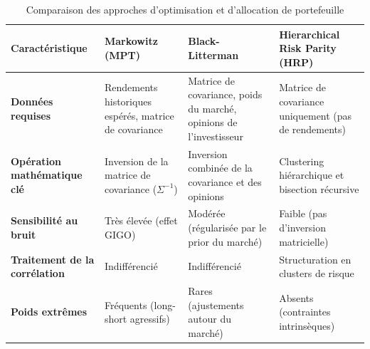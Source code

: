 \begin{table}[h]
\centering
\small
\begin{tabular}{p{3.5cm}p{3.5cm}p{3.8cm}p{3.8cm}}
\toprule
\textbf{Caractéristique} & \textbf{Markowitz (MPT)} & \textbf{Black-Litterman} & \textbf{Hierarchical Risk Parity (HRP)} \\
\midrule
\textbf{Données requises} & Rendements historiques espérés, matrice de covariance & Matrice de covariance, poids du marché, opinions de l'investisseur & Matrice de covariance uniquement (pas de rendements) \\
\textbf{Opération mathématique clé} & Inversion de la matrice de covariance ($\Sigma^{-1}$) & Inversion combinée de la covariance et des opinions & Clustering hiérarchique et bisection récursive \\
\textbf{Sensibilité au bruit} & Très élevée (effet GIGO) & Modérée (régularisée par le prior du marché) & Faible (pas d'inversion matricielle) \\
\textbf{Traitement de la corrélation} & Indifférencié & Indifférencié & Structuration en clusters de risque \\
\textbf{Poids extrêmes} & Fréquents (long-short agressifs) & Rares (ajustements autour du marché) & Absents (contraintes intrinsèques) \\
\bottomrule
\end{tabular}
\caption{Comparaison des approches d'optimisation et d'allocation de portefeuille}
\label{tab:synthese_modeles}
\end{table}


